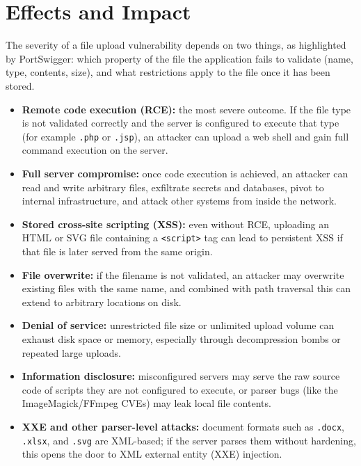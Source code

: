 \documentclass[11pt]{article}
\begin{document}
\section{Effects and Impact}

The severity of a file upload vulnerability depends on two things, as highlighted by PortSwigger: which property of the file the application fails to validate (name, type, contents, size), and what restrictions apply to the file once it has been stored.

\begin{itemize}[leftmargin=1.4em]
    \item \textbf{Remote code execution (RCE):} the most severe outcome. If the file type is not validated correctly and the server is configured to execute that type (for example \texttt{.php} or \texttt{.jsp}), an attacker can upload a web shell and gain full command execution on the server.
    \item \textbf{Full server compromise:} once code execution is achieved, an attacker can read and write arbitrary files, exfiltrate secrets and databases, pivot to internal infrastructure, and attack other systems from inside the network.
    \item \textbf{Stored cross-site scripting (XSS):} even without RCE, uploading an HTML or SVG file containing a \texttt{<script>} tag can lead to persistent XSS if that file is later served from the same origin.
    \item \textbf{File overwrite:} if the filename is not validated, an attacker may overwrite existing files with the same name, and combined with path traversal this can extend to arbitrary locations on disk.
    \item \textbf{Denial of service:} unrestricted file size or unlimited upload volume can exhaust disk space or memory, especially through decompression bombs or repeated large uploads.
    \item \textbf{Information disclosure:} misconfigured servers may serve the raw source code of scripts they are not configured to execute, or parser bugs (like the ImageMagick/FFmpeg CVEs) may leak local file contents.
    \item \textbf{XXE and other parser-level attacks:} document formats such as \texttt{.docx}, \texttt{.xlsx}, and \texttt{.svg} are XML-based; if the server parses them without hardening, this opens the door to XML external entity (XXE) injection.
\end{itemize}
\end{document}

